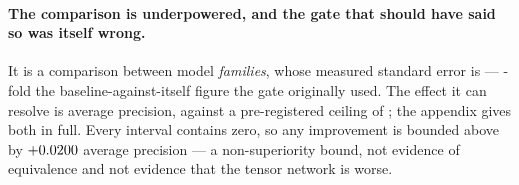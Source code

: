 \paragraph{The comparison is underpowered, and the gate that should have said so was itself
wrong.} It is a comparison between model \emph{families}, whose measured standard error is
\ClaimMpsStandardErrorBestChi{} --- \ClaimPowerSeRatio{}-fold the baseline-against-itself
figure the gate originally used. The effect it can resolve is
\ClaimMpsMdeRealised{} average precision, against a pre-registered ceiling of
\ClaimPowerCeiling{}; the appendix gives both in full. Every interval contains zero, so any
improvement is bounded above by $+0.0200{}$ average precision --- a
non-superiority bound, not evidence of equivalence and not evidence that the tensor network is
worse.

